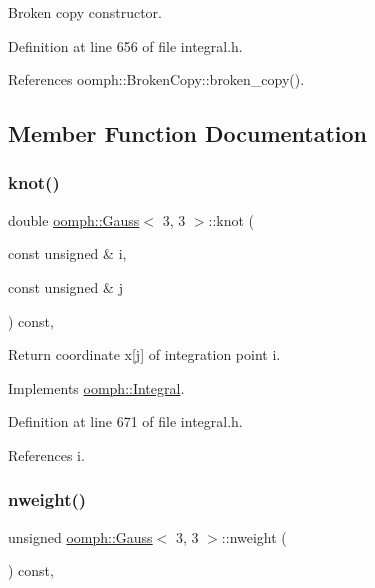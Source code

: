 Broken copy constructor. 



Definition at line 656 of file integral.\+h.



References oomph\+::\+Broken\+Copy\+::broken\+\_\+copy().



\subsection{Member Function Documentation}
\mbox{\label{classoomph_1_1Gauss_3_013_00_013_01_4_a6e6ce341a96880254bb5a5e0848a740e}} 
\subsubsection{\texorpdfstring{knot()}{knot()}}
{\footnotesize\ttfamily double \hyperlink{classoomph_1_1Gauss}{oomph\+::\+Gauss}$<$ 3, 3 $>$\+::knot (\begin{DoxyParamCaption}\item[{const unsigned \&}]{i,  }\item[{const unsigned \&}]{j }\end{DoxyParamCaption}) const\hspace{0.3cm}{\ttfamily [inline]}, {\ttfamily [virtual]}}



Return coordinate x\mbox{[}j\mbox{]} of integration point i. 



Implements \hyperlink{classoomph_1_1Integral_a1a2122f99a87c18649bafdd9ed739758}{oomph\+::\+Integral}.



Definition at line 671 of file integral.\+h.



References i.

\mbox{\label{classoomph_1_1Gauss_3_013_00_013_01_4_ab354d26f04fc5174a4a4bb74769d9e21}} 
\subsubsection{\texorpdfstring{nweight()}{nweight()}}
{\footnotesize\ttfamily unsigned \hyperlink{classoomph_1_1Gauss}{oomph\+::\+Gauss}$<$ 3, 3 $>$\+::nweight (\begin{DoxyParamCaption}{ }\end{DoxyParamCaption}) const\hspace{0.3cm}{\ttfamily [inline]}, {\ttfamily [virtual]}}



